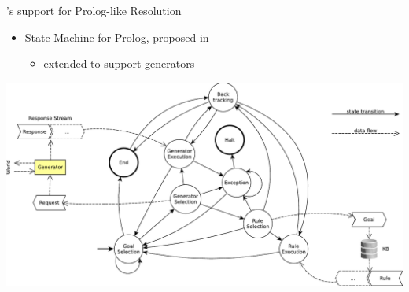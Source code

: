 \documentclass[presentation]{beamer}\mode<presentation>{\usetheme{AMSBolognaFC}}
\begin{document}
\begin{frame}{\twopkt{}'s support for Prolog-like Resolution}
    \begin{itemize}
        \item State-Machine for Prolog, proposed in 
        \begin{itemize}
            \item extended to support \alert{generators}
        \end{itemize}
    \end{itemize}

    \begin{center}
        \includegraphics[width=.8\linewidth]{figures/2p-fsa-dataflow.pdf}
    \end{center}
    \hfill{}
\end{frame}
\end{document}

